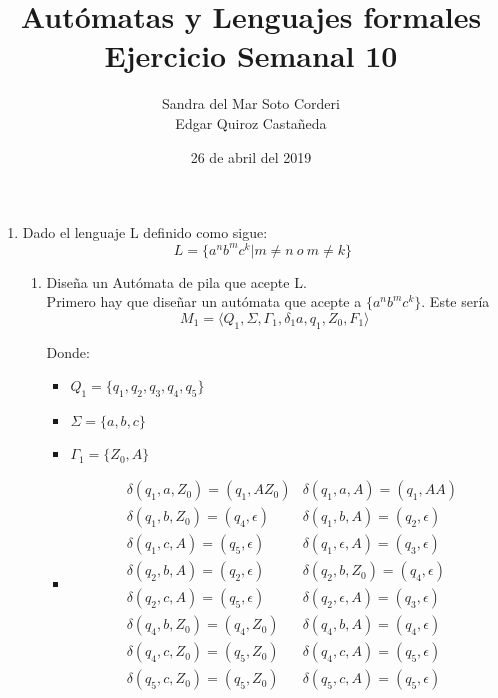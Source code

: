\documentclass{article}
\begin{document}
    \title{
        Autómatas y Lenguajes formales \\
        Ejercicio Semanal 10
    }

    \author{
        Sandra del Mar Soto Corderi \\
        Edgar Quiroz Castañeda
    }

    \date{
        26 de abril del 2019
    }
    
    \maketitle

    \begin{enumerate}
        \item {
        Dado el lenguaje L definido como sigue:\\
        \begin{equation*}
        	L = \{a^nb^mc^k | m \neq n \ o \   m \neq k \}
        \end{equation*}
        
        
        \begin{enumerate}
        	\item {
        	Diseña un Autómata de pila que acepte L.\\
         	Primero hay que diseñar un autómata que acepte a $\{a^nb^mc^k\}$.
         	Este sería 
         	\[M_1 = \langle Q_1 , \Sigma, \Gamma_1 , \delta_1a, q_1 , Z_0,  F_1\rangle\]
         
	         Donde:
	         
	         \begin{itemize}
	         	\item {
	         		$Q_1 = \{q_1, q_2, q_3, q_4, q_5\}$
	         	}
	         	\item {
	         		$\Sigma = \{a, b,c\}$
	         	}
	         	\item {
	         		$\Gamma_1 = \{Z_0, A\}$
	         	}
	         	        					 
				\item {     		
					\begin{align*}
						&\delta (q_1, a, Z_0) = (q_1, AZ_0)
						&\delta (q_1, a, A) = (q_1, AA) \\
						&\delta (q_1, b, Z_0) = (q_4, \epsilon)
						&\delta (q_1, b, A) = (q_2, \epsilon) \\
						&\delta (q_1, c, A) = (q_5, \epsilon)
						&\delta (q_1, \epsilon, A) = (q_3, \epsilon) \\
						&\delta (q_2, b, A) = (q_2, \epsilon)
						&\delta (q_2, b, Z_0) = (q_4, \epsilon) \\
						&\delta (q_2, c, A) = (q_5, \epsilon)
						&\delta (q_2, \epsilon, A) = (q_3, \epsilon) \\
						&\delta (q_4, b, Z_0) = (q_4, Z_0)
						&\delta (q_4, b, A) = (q_4, \epsilon) \\
						&\delta (q_4, c, Z_0) = (q_5, Z_0)
						&\delta (q_4, c, A) = (q_5, \epsilon) \\
						&\delta (q_5, c, Z_0) = (q_5, Z_0)
						&\delta (q_5, c, A) = (q_5, \epsilon)
	         		\end{align*}
				}
				 

\end{itemize}}
\end{enumerate}}
\end{enumerate}
\end{document}
